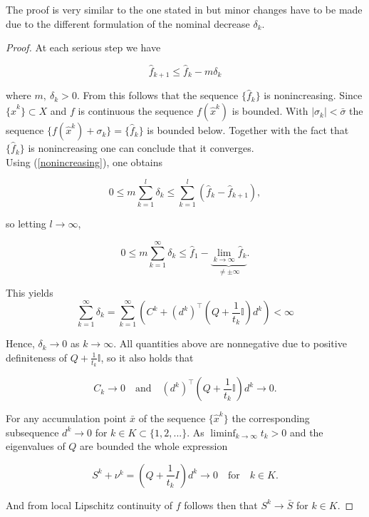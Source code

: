 The proof is very similar to the one stated in \cite{Hare2016} but minor changes have to be made due to the different formulation of the nominal decrease \(\delta_k\).

\begin{proof}
	At each serious step we have
	
	\begin{equation}
		\hat{f}_{k+1} \leq \hat{f}_k - m\delta_k
	\label{nonincreasing}
	\end{equation}
	
	where \(m, ~\delta_k > 0\). From this follows that the sequence \(\{\hat{f}_k\}\) is nonincreasing.
	Since \(\{\hat{x}^k\} \subset X\) and \(f\) is continuous the sequence \(f(\hat{x}^k)\) is bounded. %
	With \(|\sigma_k| < \bar{\sigma}\) the sequence \(\{f(\hat{x}^k)+\sigma_k\} = \{\hat{f}_k\}\) is bounded below. Together with the fact that \(\{\hat{f}_k\}\) is nonincreasing one can conclude that it converges. \\
	Using (\ref{nonincreasing}), one obtains
	
	\begin{equation*}
		0 \leq m \sum_{k = 1}^l \delta_k \leq \sum_{k = 1}^l \left(\hat{f}_k-\hat{f}_{k+1}\right),
	\end{equation*}
	
	so letting \(l \to \infty\), 
	
	\begin{equation*}
		0 \leq m\sum_{k=1}^{\infty} \delta_k \leq \hat{f}_1 - \underbrace{\lim_{k \to \infty} \hat{f}_k}_{\neq \pm \infty}.
	\end{equation*}
	
	This yields
	\begin{equation*}
		\sum_{k = 1}^{\infty} \delta_k = \sum_{k=1}^{\infty}\left(C^k+(d^k)^{\top}\left(Q+\frac{1}{t_k}\mathbb{I}\right)d^k\right) < \infty
	\end{equation*}
	
	Hence, \(\delta_k \to 0\) as \(k \to \infty\). All quantities above are nonnegative due to positive definiteness of \(Q+\frac{1}{t_k}\mathbb{I}\), so it also holds that
	
	\begin{equation*}
		C_k \to 0 \quad \text{and} \quad (d^k)^{\top}\left(Q+\frac{1}{t_k}\mathbb{I}\right)d^k \to 0.
	\end{equation*}
	
	For any accumulation point \(\bar{x}\) of the sequence \(\{\hat{x}^k\}\) the corresponding subsequence \(d^k \to 0\) for \(k \in K \subset \{1,2,...\} \). As \(\liminf_{k \to \infty} t_k > 0\) and the eigenvalues of \(Q\) are bounded the whole expression 
	
	\begin{equation*}
	 S^k + \nu^k = \left(Q+\frac{1}{t_k}I \right)d^k  \to 0 \quad \text{for} \quad k \in K.
	\end{equation*}
	
	And from local Lipschitz continuity of \(f\) follows then that \(S^k \to \bar{S}\) for \(k \in K\).
	
\end{proof}

